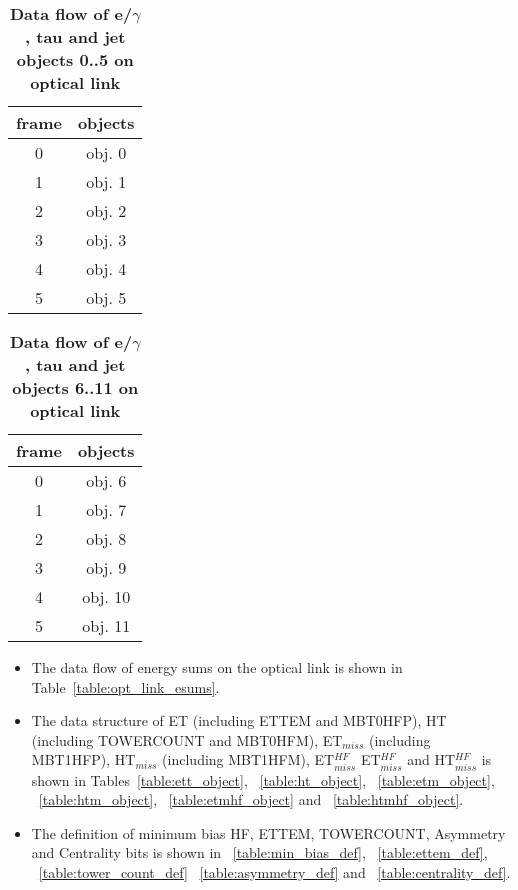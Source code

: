 \documentclass{cmspaper}
\begin{document}
\begin{table}[htdp]
\caption{\bf Data flow of e/$\gamma$, tau and jet objects 0..5 on optical link}
\vspace{5mm}
\centering
\begin{tabular}{|c|c|}\hline
frame & objects\\\hline\hline
0 & obj. 0 \\\hline
1 & obj. 1 \\\hline
2 & obj. 2 \\\hline
3 & obj. 3 \\\hline
4 & obj. 4 \\\hline
5 & obj. 5 \\\hline
\end{tabular}
\label{table:opt_link_egamma_obj_0_5}
\end{table}

\begin{table}[htdp]
\caption{\bf Data flow of e/$\gamma$, tau and jet objects 6..11 on optical link}
\vspace{5mm}
\centering
\begin{tabular}{|c|c|}\hline
frame & objects\\\hline\hline
0 & obj. 6 \\\hline
1 & obj. 7 \\\hline
2 & obj. 8 \\\hline
3 & obj. 9 \\\hline
4 & obj. 10 \\\hline
5 & obj. 11 \\\hline
\end{tabular}
\label{table:opt_link_egamma_obj_6_11}
\end{table}

\clearpage

\begin{itemize}
\item The data flow of energy sums on the optical link is shown in Table~\ref{table:opt_link_esums}.
\item The data structure of ET (including ETTEM and MBT0HFP), HT (including TOWERCOUNT and MBT0HFM), ET$_{miss}$ (including MBT1HFP), HT$_{miss}$ (including MBT1HFM), ET$_{miss}^{HF}$    ET$_{miss}^{HF}$
and HT$_{miss}^{HF}$
is shown in Tables~\ref{table:ett_object}, ~\ref{table:ht_object}, ~\ref{table:etm_object}, ~\ref{table:htm_object}, ~\ref{table:etmhf_object} and ~\ref{table:htmhf_object}.
\item The definition of minimum bias HF, ETTEM, TOWERCOUNT, Asymmetry and Centrality bits is shown in ~\ref{table:min_bias_def}, ~\ref{table:ettem_def}, ~\ref{table:tower_count_def}
~\ref{table:asymmetry_def} and ~\ref{table:centrality_def}.
\end{itemize}
\end{document}
